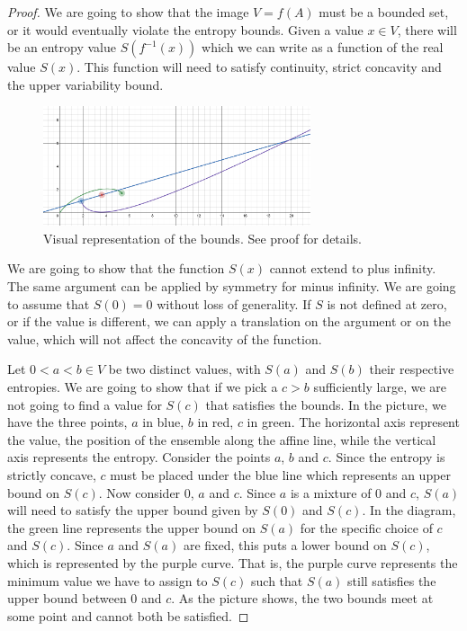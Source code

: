 \begin{mathSection}
\begin{proof}
	We are going to show that the image $V=f(A)$ must be a bounded set, or it would eventually violate the entropy bounds. Given a value $x \in V$, there will be an entropy value $S(f^{-1}(x))$ which we can write as a function of the real value $S(x)$. This function will need to satisfy continuity, strict concavity and the upper variability bound.

\begin{figure}[H]
	\centering
	\includegraphics[width=0.7\textwidth]{tempimages/BoundsFromEntropy.png}
	\caption{Visual representation of the bounds. See proof for details.}\label{pm_es_directionallyBound}
\end{figure}
	We are going to show that the function $S(x)$ cannot extend to plus infinity. The same argument can be applied by symmetry for minus infinity. We are going to assume that $S(0) = 0$ without loss of generality. If $S$ is not defined at zero, or if the value is different, we can apply a translation on the argument or on the value, which will not affect the concavity of the function.
	
	Let $0 < a < b \in V$ be two distinct values, with $S(a)$ and $S(b)$ their respective entropies. We are going to show that if we pick a $c > b$ sufficiently large, we are not going to find a value for $S(c)$ that satisfies the bounds. In the picture, we have the three points, $a$ in blue, $b$ in red, $c$ in green. The horizontal axis represent the value, the position of the ensemble along the affine line, while the vertical axis represents the entropy. Consider the points $a$, $b$ and $c$. Since the entropy is strictly concave, $c$ must be placed under the blue line which represents an upper bound on $S(c)$. Now consider $0$, $a$ and $c$. Since $a$ is a mixture of $0$ and $c$, $S(a)$ will need to satisfy the upper bound given by $S(0)$ and $S(c)$. In the diagram, the green line represents the upper bound on $S(a)$ for the specific choice of $c$ and $S(c)$. Since $a$ and $S(a)$ are fixed, this puts a lower bound on $S(c)$, which is represented by the purple curve. That is, the purple curve represents the minimum value we have to assign to $S(c)$ such that $S(a)$ still satisfies the upper bound between $0$ and $c$. As the picture shows, the two bounds meet at some point and cannot both be satisfied.
	

\end{proof}
\end{mathSection}
